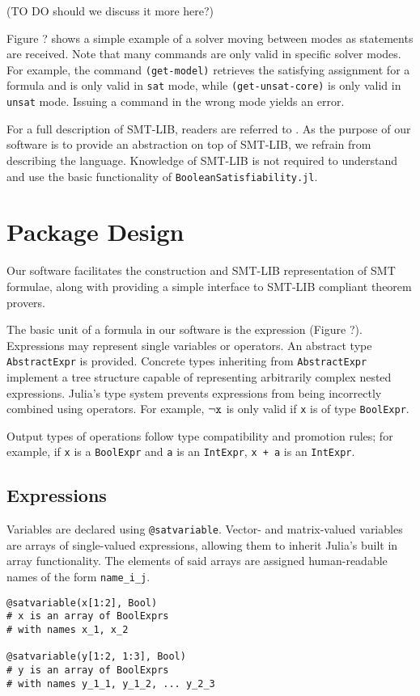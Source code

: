 \documentclass[conference]{IEEEtran}
\begin{document}
(TO DO should we discuss it more here?) %

Figure ? %
shows a simple example of a solver moving between modes as statements are received. Note that many commands are only valid in specific solver modes.
For example, the command \verb|(get-model)| retrieves the satisfying assignment for a formula and is only valid in \verb|sat| mode, while \verb|(get-unsat-core)| is only valid in \verb|unsat| mode. Issuing a command in the wrong mode yields an error.

For a full description of SMT-LIB, readers are referred to \cite{smtlib2}. As the purpose of our software is to provide an abstraction on top of SMT-LIB, we refrain from describing the language. Knowledge of SMT-LIB is not required to understand and use the basic functionality of \verb|BooleanSatisfiability.jl|.

\section{Package Design}
Our software facilitates the construction and SMT-LIB representation of SMT formulae, along with providing a simple interface to SMT-LIB compliant theorem provers.

The basic unit of a formula in our software is the expression (Figure ?). %
Expressions may represent single variables or operators. An abstract type \verb|AbstractExpr| is provided. Concrete types inheriting from \verb|AbstractExpr| implement a tree structure capable of representing arbitrarily complex nested expressions. Julia's type system prevents expressions from being incorrectly combined using operators. For example, $\neg\verb|x|$ is only valid if \verb|x| is of type \verb|BoolExpr|.

Output types of operations follow type compatibility and promotion rules; for example, if \verb|x| is a \verb|BoolExpr| and \verb|a| is an \verb|IntExpr|, \verb|x + a| is an \verb|IntExpr|.

\subsection{Expressions}
Variables are declared using \verb|@satvariable|. Vector- and matrix-valued variables are arrays of single-valued expressions, allowing them to inherit Julia's built in array functionality. The elements of said arrays are assigned human-readable names of the form \verb|name_i_j|.
\begin{verbatim}
@satvariable(x[1:2], Bool)
# x is an array of BoolExprs
# with names x_1, x_2

@satvariable(y[1:2, 1:3], Bool)
# y is an array of BoolExprs
# with names y_1_1, y_1_2, ... y_2_3 
\end{verbatim}
\end{document}
